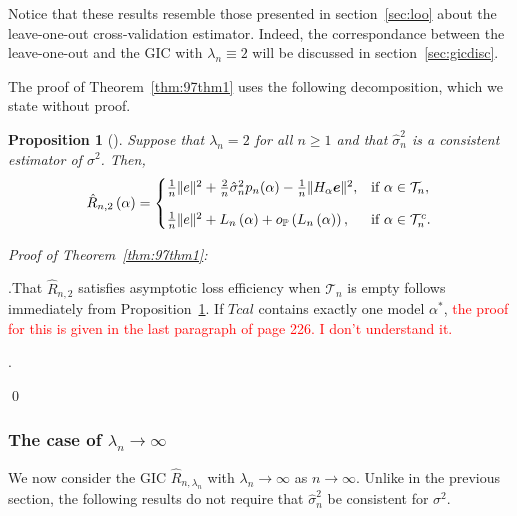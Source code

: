 \documentclass[11pt, letter paper]{article}
\newcommand{\1}{\mathmybb{1}}
\newtheorem{proposition}{Proposition}[section]
\newcommand{\0}{\emptyset}
\newcommand{\prob}{\mathbb{P}}
\newcommand{\paren}[1]{\left(#1 \right)}
\newcommand{\norm}[1]{|\hspace{-1pt}|#1 |\hspace{-1pt}|}
\newcommand{\normsq}[1]{\norm{#1}^{2}}
\newcommand{\Acal}{\mathcal{A}_{n}}
\newcommand{\Tcal}{\mathcal{T}_{n}}
\newcommand{\Ncal}{\mathcal{N}}
\newcommand{\e}{\boldsymbol{e}}
\newcommand{\Loss}[1]{L_{n}\paren{#1}}
\newcommand{\Rhat}[2]{\hat{R}_{n, #1}\paren{#2}}
\newcommand{\op}[1]{o_{\prob}\paren{#1}}
\newcommand{\sigmahat}{\hat{\sigma}^{2}_{n}}
\begin{document}

Notice that these results resemble those presented in section~{\ref{sec:loo}} about the leave-one-out cross-validation estimator. Indeed, the correspondance between the leave-one-out and the GIC with \(\lambda_{n}\equiv 2\) will be discussed in section~{\ref{sec:gicdisc}}.

The proof of Theorem~\ref{thm:97thm1} uses the following decomposition, which we state without proof.

\begin{proposition}[\cite{shao_1997}]\label{prop:97decomp1}
    Suppose that \(\lambda_{n}=2\) for all \(n\geq 1\) and that \(\sigmahat\) is a consistent estimator of \(\sigma^{2}\). Then,
    \[\Rhat{2}{\alpha} = \begin{cases}
        \frac{1}{n}\normsq{e} + \frac{2}{n}\sigmahat p_{n}(\alpha) - \frac{1}{n}\normsq{H_{\alpha}\e}, &\text{if }\alpha\in\Tcal,\\[3mm]
        \frac{1}{n}\normsq{e} + \Loss{\alpha} + \op{\Loss{\alpha}}, &\text{if }\alpha\in\Tcal^{c}.
    \end{cases}\]
\end{proposition}

\begin{myproofbox}
    \textit{Proof of Theorem~\ref{thm:97thm1}: }

    .\quad That \(\hat{R}_{n,2}\) satisfies asymptotic loss efficiency when \(\Tcal\) is empty follows immediately from Proposition~\ref{prop:97decomp1}. If \(Tcal\) contains exactly one model \(\alpha^{*}\), \textcolor{red}{the proof for this is given in the last paragraph of page 226. I don't understand it.}
    
    .\quad 

    \qed{}
\end{myproofbox}

\subsubsection{The case of \(\lambda_{n} \to \infty\)}

We now consider the GIC \(\hat{R}_{n,\lambda_{n}}\) with \(\lambda_{n}\to\infty\) as \(n\to \infty\). Unlike in the previous section, the following results do not require that \(\sigmahat\) be consistent for \(\sigma^{2}\).
\end{document}
